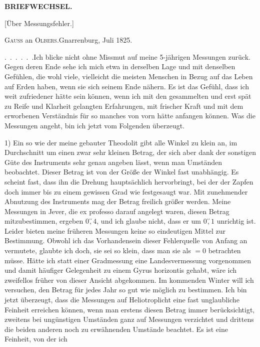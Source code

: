 \par\clearpage
\noindent{}\hfill{\small\textbf{BRIEFWECHSEL.}}\hfill\null\par\bigskip
\begin{center}{\large [Über Messungsfehler.]}\par\bigskip
{\large\textsc{Gauss} an \textsc{Olbers}.\quad Gnarrenburg, Juli 1825.}\end{center}
\par\noindent\hspace*{\parindent}.\ .\ .\ .\ .\ .\enspace Ich blicke nicht ohne Missmut auf meine 5-jährigen Messungen zurück. Gegen deren Ende sehe ich mich etwa in derselben Lage und mit denselben Gefühlen, die wohl viele, vielleicht die meisten Menschen in Bezug auf das Leben auf Erden haben, wenn sie sich seinem Ende nähern. Es ist das Gefühl, dass ich weit zufriedener hätte sein können, wenn ich mit den gesammelten und erst spät zu Reife und Klarheit gelangten Erfahrungen, mit frischer Kraft und mit dem erworbenen Verständnis für so manches von vorn hätte anfangen können. Was die Messungen angeht, bin ich jetzt vom Folgenden überzeugt.

\par\noindent\hspace*{\parindent}1) Ein so wie der meine gebauter Theodolit gibt alle Winkel zu klein an, im Durchschnitt um einen zwar sehr kleinen Betrag, der sich aber dank der sonstigen Güte des Instruments sehr genau angeben lässt, wenn man  Umständen beobachtet. Dieser Betrag ist von der Größe der Winkel fast unabhängig. Es scheint fast, dass ihn die  Drehung hauptsächlich hervorbringt, bei der der Zapfen doch immer bis zu einem gewissen Grad wie festgesaugt war. Mit zunehmender Abnutzung des Instruments mag der Betrag freilich größer werden. Meine Messungen in Jever, die ex professo darauf angelegt waren, diesen Betrag mitzubestimmen, ergeben $0\overset{\prime\prime}{,}4$, und ich glaube nicht, dass er um $0\overset{\prime\prime}{,}1$ unrichtig ist. Leider bieten meine früheren Messungen keine so eindeutigen Mittel zur Bestimmung. Obwohl ich das Vorhandensein dieser Fehlerquelle von Anfang an vermutete, glaubte ich doch, sie sei so klein, dass man sie als $=0$ betrachten müsse. Hätte ich statt einer Gradmessung eine Landesvermessung vorgenommen und damit häufiger Gelegenheit zu einem Gyrus horizontis gehabt, wäre ich zweifellos früher von dieser Ansicht abgekommen. Im kommenden Winter will ich versuchen, den Betrag für jedes Jahr so gut wie möglich zu bestimmen. Ich bin jetzt überzeugt, dass die Messungen auf Heliotroplicht eine fast unglaubliche Feinheit erreichen können, wenn man erstens diesen Betrag immer berücksichtigt, zweitens bei ungünstigen Umständen ganz auf Messungen verzichtet und drittens die beiden anderen noch zu erwähnenden Umstände beachtet. Es ist eine Feinheit, von der ich

